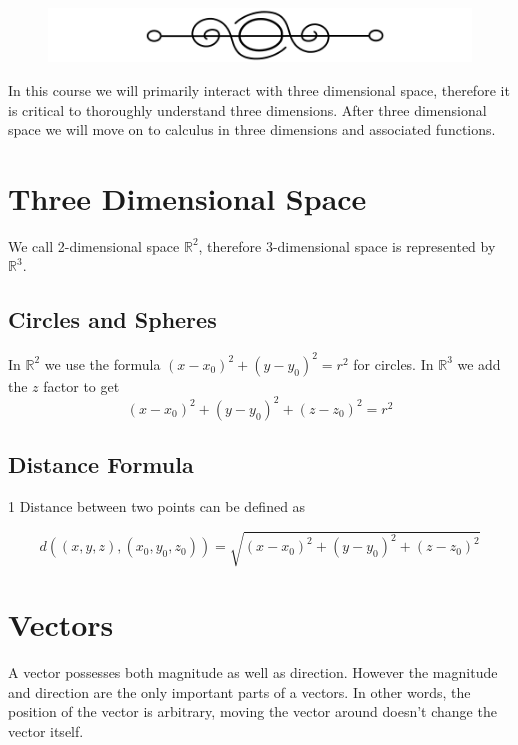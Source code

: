 \documentclass{article}
\begin{document}
\title{}
\author{Zoe Farmer}
\maketitle

\tableofcontents
{}
\listoffigures
{}

\begin{figure}[h]
    \centering
    \includegraphics[scale=0.25]{break.png}
\end{figure}

In this course we will primarily interact with three dimensional space, therefore it is critical to thoroughly understand three dimensions. After three dimensional space we will move on to calculus in three dimensions and associated functions.

\section{Three Dimensional Space}
We call 2-dimensional space $ \mathbb{R}^2 $, therefore 3-dimensional space is represented by $ \mathbb{R}^3 $.

    \subsection{Circles and Spheres}
    In $\mathbb{R}^2$ we use the formula $(x-x_0)^2+(y-y_0)^2=r^2$ for circles. In $\mathbb{R}^3$ we add the $z$ factor to get
    \begin{equation}
    (x-x_0)^2+(y-y_0)^2+(z-z_0)^2=r^2
    \end{equation}

    \subsection{Distance Formula}1
    Distance between two points can be defined as

    \begin{equation}
    d((x, y, z), (x_0, y_0, z_0)) = \sqrt{(x - x_0)^2 + (y - y_0)^2 + (z - z_0)^2}
    \end{equation}

\section{Vectors}
A vector possesses both magnitude as well as direction. However the magnitude and direction are the only important parts of a vectors. In other words, the position of the vector is arbitrary, moving the vector around doesn't change the vector itself.
\end{document}
